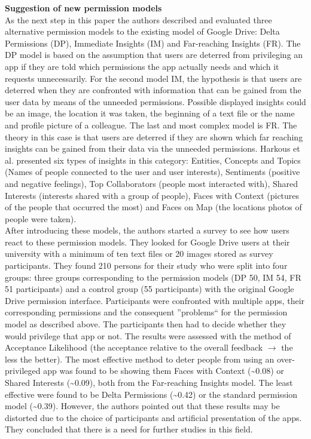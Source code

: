 \documentclass[11pt,twocolumn,a4paper,DIV=calc]{scrartcl}
\begin{document}
\textbf{Suggestion of new permission models} \\
As the next step in this paper the authors described and evaluated three alternative permission models to the existing model of Google Drive: Delta Permissions (DP), Immediate Insights (IM) and Far-reaching Insights (FR).
The DP model is based on the assumption that users are deterred from privileging an app if they are told which permissions the app actually needs and which it requests unnecessarily. For the second model IM, the hypothesis is that users are deterred when they are confronted with information that can be gained from the user data by means of the unneeded permissions. Possible displayed insights could be an image, the location it was taken, the beginning of a text file or the name and profile picture of a colleague. The last and most complex model is FR. The theory in this case is that users are deterred if they are shown which far reaching insights can be gained from their data via the unneeded permissions. Harkous et al. presented six types of insights in this category: Entities, Concepts and Topics (Names of people connected to the user and user interests), Sentiments (positive and negative feelings), Top Collaborators (people most interacted with), Shared Interests (interests shared with a group of people), Faces with Context (pictures of the people that occurred the most) and Faces on Map (the locations photos of people were taken). \\ 
After introducing these models, the authors started a survey to see how users react to these permission models. They looked for Google Drive users at their university with a minimum of ten text files or 20 images stored as survey participants. They found 210 persons for their study who were split into four groups: three groups corresponding to the permission models (DP 50, IM 54, FR 51 participants) and a control group (55 participants) with the original Google Drive permission interface. Participants were confronted with multiple apps, their corresponding permissions and the consequent ''problems`` for the permission model as described above. The participants then had to decide whether they would privilege that app or not. The results were assessed with the method of Acceptance Likelihood (the acceptance relative to the overall feedback $\rightarrow$ the less the better). The most effective method to deter people from using an over-privileged app was found to be showing them Faces with Context (\textasciitilde 0.08) or Shared Interests (\textasciitilde 0.09), both from the Far-reaching Insights model. The least effective were found to be Delta Permissions (\textasciitilde 0.42) or the standard permission model (\textasciitilde 0.39). However, the authors pointed out that these results may be distorted due to the choice of participants and artificial presentation of the apps. They concluded that there is a need for further studies in this field. \\
\end{document}
